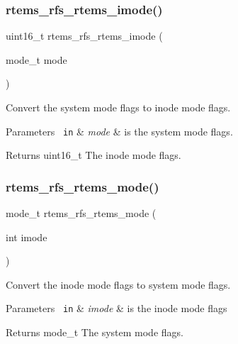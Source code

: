 \subsubsection{\texorpdfstring{rtems\_rfs\_rtems\_imode()}{rtems\_rfs\_rtems\_imode()}}
{\footnotesize\ttfamily uint16\+\_\+t rtems\+\_\+rfs\+\_\+rtems\+\_\+imode (\begin{DoxyParamCaption}\item[{mode\+\_\+t}]{mode }\end{DoxyParamCaption})}

Convert the system mode flags to inode mode flags.


\begin{DoxyParams}[1]{Parameters}
\mbox{\texttt{ in}}  & {\em mode} & is the system mode flags. \\
\hline
\end{DoxyParams}
\begin{DoxyReturn}{Returns}
uint16\+\_\+t The inode mode flags. 
\end{DoxyReturn}
\mbox{\label{rtems-rfs-rtems_8h_aff5423998d0f78a1caecd4acff199690}} 
\subsubsection{\texorpdfstring{rtems\_rfs\_rtems\_mode()}{rtems\_rfs\_rtems\_mode()}}
{\footnotesize\ttfamily mode\+\_\+t rtems\+\_\+rfs\+\_\+rtems\+\_\+mode (\begin{DoxyParamCaption}\item[{int}]{imode }\end{DoxyParamCaption})}

Convert the inode mode flags to system mode flags.


\begin{DoxyParams}[1]{Parameters}
\mbox{\texttt{ in}}  & {\em imode} & is the inode mode flags \\
\hline
\end{DoxyParams}
\begin{DoxyReturn}{Returns}
mode\+\_\+t The system mode flags. 
\end{DoxyReturn}
\mbox{\label{rtems-rfs-rtems_8h_acb8e7e6615d937f61862719b00445978}} 
